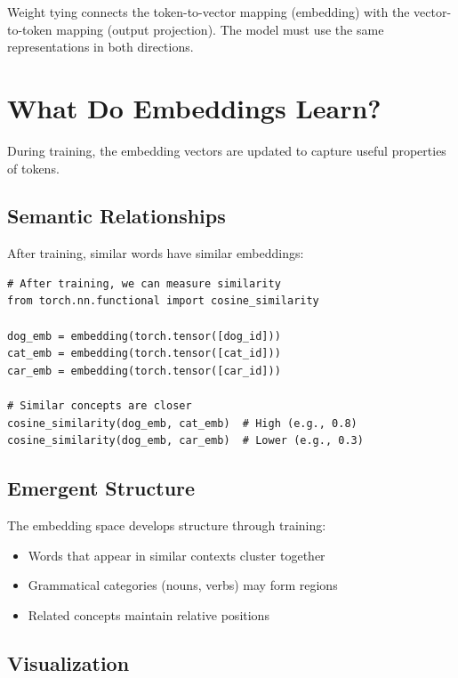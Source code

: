 \begin{keypoint}
Weight tying connects the token-to-vector mapping (embedding) with the vector-to-token mapping (output projection). The model must use the same representations in both directions.
\end{keypoint}

\section{What Do Embeddings Learn?}

During training, the embedding vectors are updated to capture useful properties of tokens.

\subsection{Semantic Relationships}

After training, similar words have similar embeddings:

\begin{lstlisting}[style=python]
# After training, we can measure similarity
from torch.nn.functional import cosine_similarity

dog_emb = embedding(torch.tensor([dog_id]))
cat_emb = embedding(torch.tensor([cat_id]))
car_emb = embedding(torch.tensor([car_id]))

# Similar concepts are closer
cosine_similarity(dog_emb, cat_emb)  # High (e.g., 0.8)
cosine_similarity(dog_emb, car_emb)  # Lower (e.g., 0.3)
\end{lstlisting}

\subsection{Emergent Structure}

The embedding space develops structure through training:
\begin{itemize}
    \item Words that appear in similar contexts cluster together
    \item Grammatical categories (nouns, verbs) may form regions
    \item Related concepts maintain relative positions
\end{itemize}

\subsection{Visualization}

